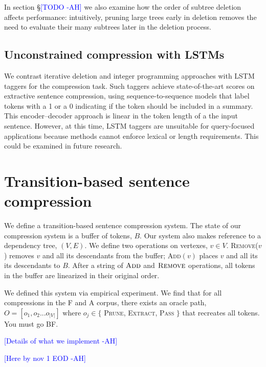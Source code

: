 \documentclass[11pt,a4paper]{article}
\newcommand{\ahcomment}[1]{\textcolor{blue}{[#1 -AH]}}
\begin{document}
In section \S\ahcomment{TODO} we also examine how the order of subtree deletion affects performance: intuitively, pruning large trees early in deletion removes the need to evaluate their many subtrees later in the deletion process.

\subsection{Unconstrained compression with LSTMs}

We contrast iterative deletion and integer programming approaches with LSTM taggers for the compression task. Such taggers achieve state-of-the-art scores on extractive sentence compression, using sequence-to-sequence models that label tokens with a 1 or a 0 indicating if the token should be included in a summary. This encoder--decoder approach is linear in the token length of a the input sentence. However, at this time, LSTM taggers are unsuitable for query-focused applications because methods cannot enforce lexical or length requirements. This could be examined in future research.

\section{Transition-based sentence compression}

We define a transition-based sentence compression system. The state of our compression system is a buffer of tokens, $B$. Our system also makes reference to a dependency tree, $(V, E)$. We define two operations on vertexes, $v \in V$. \textsc{Remove}($v$) removes $v$ and all its descendants from the buffer;  \textsc{Add}$(v)$ places $v$ and all its its descendants to $B$. After a string of $\textsc{Add}$ and $\textsc{Remove}$ operations, all tokens in the buffer are linearized in their original order.

We defined this system via empirical experiment. We find that for all compressions in the F and A corpus, there exists an oracle path, $O=[o_1, o_2 ... o_{|V|}]$ where $o_j \in \{$ \textsc{Prune}, \textsc{Extract}, \textsc{Pass} $\}$ that recreates all tokens. You must go BF. 

\ahcomment{Details of what we implement}


\ahcomment{Here by nov 1 EOD}
\end{document}

